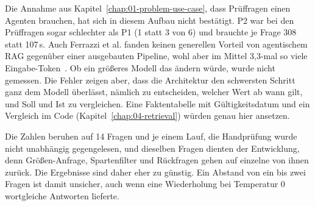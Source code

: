 Die Annahme aus Kapitel~\ref{chap:01-problem-use-case}, dass Prüffragen einen Agenten brauchen, hat sich in diesem Aufbau nicht bestätigt. P2 war bei den Prüffragen sogar schlechter als P1 (1 statt 3 von 6) und brauchte je Frage 308 statt 107\,s. Auch Ferrazzi et al. fanden keinen generellen Vorteil von agentischem RAG gegenüber einer ausgebauten Pipeline, wohl aber im Mittel 3,3-mal so viele Eingabe-Token~\cite{ferrazzi2026agentic}. Ob ein größeres Modell das ändern würde, wurde nicht gemessen. Die Fehler zeigen aber, dass die Architektur den schwersten Schritt ganz dem Modell überlässt, nämlich zu entscheiden, welcher Wert ab wann gilt, und Soll und Ist zu vergleichen. Eine Faktentabelle mit Gültigkeitsdatum und ein Vergleich im Code (Kapitel~\ref{chap:04-retrieval}) würden genau hier ansetzen.

Die Zahlen beruhen auf 14 Fragen und je einem Lauf, die Handprüfung wurde nicht unabhängig gegengelesen, und dieselben Fragen dienten der Entwicklung, denn Größen-Anfrage, Spartenfilter und Rückfragen gehen auf einzelne von ihnen zurück. Die Ergebnisse sind daher eher zu günstig. Ein Abstand von ein bis zwei Fragen ist damit unsicher, auch wenn eine Wiederholung bei Temperatur 0 wortgleiche Antworten lieferte.
